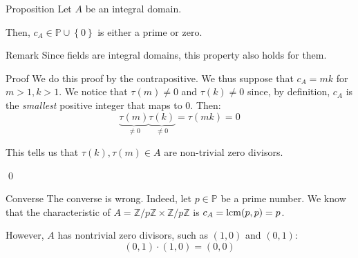 \documentclass[a4paper]{article}
\begin{document}
\begin{parag}{Proposition}
    Let $A$ be an integral domain.

    Then, $c_A \in \mathbb{P} \cup \left\{0\right\}$ is either a prime or zero.

    \begin{subparag}{Remark}
        Since fields are integral domains, this property also holds for them.
    \end{subparag}

    \begin{subparag}{Proof}
        We do this proof by the contrapositive. We thus suppose that $c_A = m k$ for $m> 1, k > 1$. We notice that $\tau\left(m\right) \neq 0$ and $\tau\left(k\right) \neq 0$ since, by definition, $c_A$ is the \textit{smallest} positive integer that maps to 0. Then: 
        \[\underbrace{\tau\left(m\right)}_{\neq 0} \underbrace{\tau\left(k\right)}_{\neq 0} = \tau\left(m k\right) = 0\]
        
        This tells us that $\tau\left(k\right), \tau\left(m\right) \in A$ are non-trivial zero divisors.

        \qed
    \end{subparag}

    \begin{subparag}{Converse}
        The converse is wrong. Indeed, let $p \in \mathbb{P}$ be a prime number. We know that the characteristic of $A = \mathbb{Z}/p\mathbb{Z} \times \mathbb{Z}/p\mathbb{Z}$ is $c_A = \lcm\left(p, p\right) = p$.

        However, $A$ has nontrivial zero divisors, such as $\left(1, 0\right)$ and $\left(0, 1\right)$: 
        \[\left(0, 1\right)\cdot \left(1, 0\right) = \left(0, 0\right)\]
    \end{subparag}
\end{parag}
\end{document}
